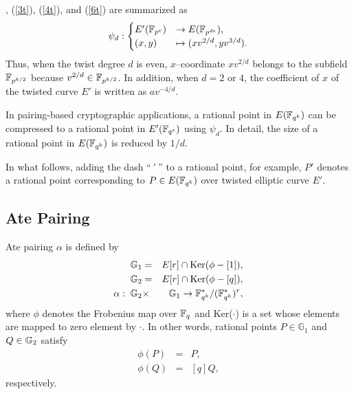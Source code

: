 
, (\ref{3t}), (\ref{4t}), and (\ref{6t}) are summarized as
\begin{eqnarray}
\psi_d : 
\begin{cases}
E'({\mathbb{F}}_{p^{e}}) & \rightarrow  E({\mathbb{F}}_{p^{de}}), \\
(x,y) & \mapsto (xv^{2/d},yv^{3/d}).
\end{cases} \label{gt}
\end{eqnarray}
Thus, when the twist degree $d$ is even, $x$--coordinate $xv^{2/d}$ belongs to the subfield ${\mathbb{F}}_{p^{k/2}}$ because $v^{2/d}\in {\mathbb{F}}_{p^{k/2}}$. In addition, when $d=2$ or $4$, the coefficient of $x$ of the twisted curve $E'$ is written as $av^{-4/d}$.

In pairing-based cryptographic applications, a rational point in $E({\mathbb{F}}_{q^{k}})$ can be compressed to a rational point in $E'({\mathbb{F}}_{q^{e}})$ using $\psi_d$.
In detail, the size of a rational point in $E({\mathbb{F}}_{q^{k}})$ is reduced by $1/d$.

In what follows, adding the dash ``$\ '\ $'' to a rational point, for example, $P'$ denotes a rational point corresponding to $P \in E({\mathbb{F}}_{q^{k}})$ over twisted elliptic curve $E'$.

\subsection{Ate Pairing}
Ate pairing $\alpha$ \cite{PAIRING:Hess08} is defined by
\begin{eqnarray}
{\mathbb{G}}_{1} &=& E[r]\cap {\rm Ker}(\phi-[1]), \nonumber \\
{\mathbb{G}}_{2} &=& E[r]\cap {\rm Ker}(\phi-[q]), \nonumber \\
\alpha :\;{\mathbb{G}}_{2} &\times& {\mathbb{G}}_{1} \rightarrow {\mathbb{F}}_{q^{k}} ^*/({\mathbb{F}}_{q^{k}} ^*)^r, \label{eq:AteDef}
\end{eqnarray}
where $\phi$ denotes the Frobenius map over ${\mathbb{F}}_{q^{}}$ and Ker($\cdot $) is a set whose elements are mapped to zero element by $\cdot $.
In other words, rational points $P\in\mathbb{G}_1$ and $Q\in{\mathbb{G}}_{2}$ satisfy 
\begin{eqnarray}
\phi(P) &=& P, \\
\phi(Q) &=& [q]Q,
\end{eqnarray}
respectively.  

